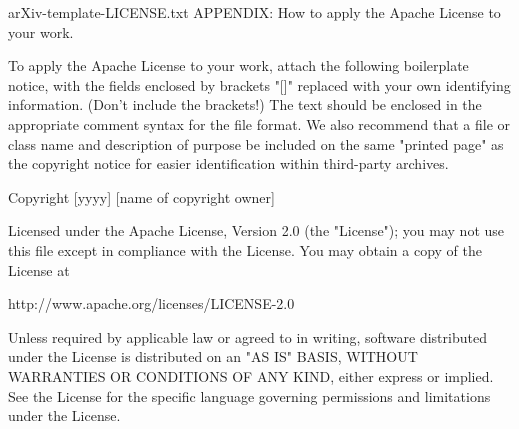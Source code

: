 \begin{filecontents*}{arXiv-template-LICENSE.txt}
   APPENDIX: How to apply the Apache License to your work.

      To apply the Apache License to your work, attach the following
      boilerplate notice, with the fields enclosed by brackets "[]"
      replaced with your own identifying information. (Don't include
      the brackets!)  The text should be enclosed in the appropriate
      comment syntax for the file format. We also recommend that a
      file or class name and description of purpose be included on the
      same "printed page" as the copyright notice for easier
      identification within third-party archives.

   Copyright [yyyy] [name of copyright owner]

   Licensed under the Apache License, Version 2.0 (the "License");
   you may not use this file except in compliance with the License.
   You may obtain a copy of the License at

       http://www.apache.org/licenses/LICENSE-2.0

   Unless required by applicable law or agreed to in writing, software
   distributed under the License is distributed on an "AS IS" BASIS,
   WITHOUT WARRANTIES OR CONDITIONS OF ANY KIND, either express or implied.
   See the License for the specific language governing permissions and
   limitations under the License.
\end{filecontents*}

